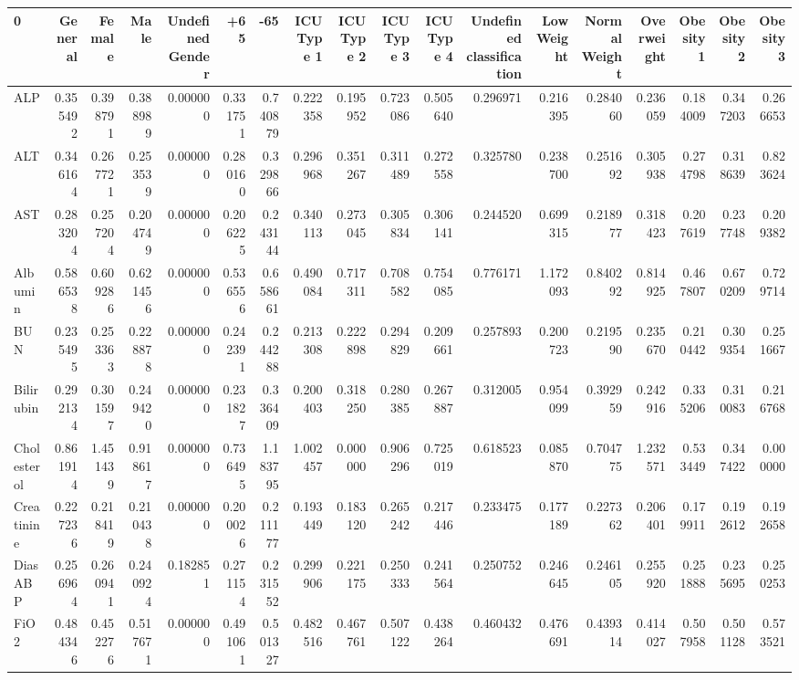 \begin{tabular}{lrrrrrrrrrrrrrrrrr}
\toprule
0 & General & Female & Male & Undefined Gender & +65 & -65 & ICUType 1 & ICUType 2 & ICUType 3 & ICUType 4 & Undefined classification & Low Weight & Normal Weight & Overweight & Obesity 1 & Obesity 2 & Obesity 3 \\
\midrule
ALP & 0.355492 & 0.398791 & 0.388989 & 0.000000 & 0.331751 & 0.740879 & 0.222358 & 0.195952 & 0.723086 & 0.505640 & 0.296971 & 0.216395 & 0.284060 & 0.236059 & 0.184009 & 0.347203 & 0.266653 \\
ALT & 0.346164 & 0.267721 & 0.253539 & 0.000000 & 0.280160 & 0.329866 & 0.296968 & 0.351267 & 0.311489 & 0.272558 & 0.325780 & 0.238700 & 0.251692 & 0.305938 & 0.274798 & 0.318639 & 0.823624 \\
AST & 0.283204 & 0.257204 & 0.204749 & 0.000000 & 0.206225 & 0.243144 & 0.340113 & 0.273045 & 0.305834 & 0.306141 & 0.244520 & 0.699315 & 0.218977 & 0.318423 & 0.207619 & 0.237748 & 0.209382 \\
Albumin & 0.586538 & 0.609286 & 0.621456 & 0.000000 & 0.536556 & 0.658661 & 0.490084 & 0.717311 & 0.708582 & 0.754085 & 0.776171 & 1.172093 & 0.840292 & 0.814925 & 0.467807 & 0.670209 & 0.729714 \\
BUN & 0.235495 & 0.253363 & 0.228878 & 0.000000 & 0.242391 & 0.244288 & 0.213308 & 0.222898 & 0.294829 & 0.209661 & 0.257893 & 0.200723 & 0.219590 & 0.235670 & 0.210442 & 0.309354 & 0.251667 \\
Bilirubin & 0.292134 & 0.301597 & 0.249420 & 0.000000 & 0.231827 & 0.336409 & 0.200403 & 0.318250 & 0.280385 & 0.267887 & 0.312005 & 0.954099 & 0.392959 & 0.242916 & 0.335206 & 0.310083 & 0.216768 \\
Cholesterol & 0.861914 & 1.451439 & 0.918617 & 0.000000 & 0.736495 & 1.183795 & 1.002457 & 0.000000 & 0.906296 & 0.725019 & 0.618523 & 0.085870 & 0.704775 & 1.232571 & 0.533449 & 0.347422 & 0.000000 \\
Creatinine & 0.227236 & 0.218419 & 0.210438 & 0.000000 & 0.200026 & 0.211177 & 0.193449 & 0.183120 & 0.265242 & 0.217446 & 0.233475 & 0.177189 & 0.227362 & 0.206401 & 0.179911 & 0.192612 & 0.192658 \\
DiasABP & 0.256964 & 0.260941 & 0.240924 & 0.182851 & 0.271154 & 0.231552 & 0.299906 & 0.221175 & 0.250333 & 0.241564 & 0.250752 & 0.246645 & 0.246105 & 0.255920 & 0.251888 & 0.235695 & 0.250253 \\
FiO2 & 0.484346 & 0.452276 & 0.517671 & 0.000000 & 0.491061 & 0.501327 & 0.482516 & 0.467761 & 0.507122 & 0.438264 & 0.460432 & 0.476691 & 0.439314 & 0.414027 & 0.507958 & 0.501128 & 0.573521 \\

\end{tabular}
